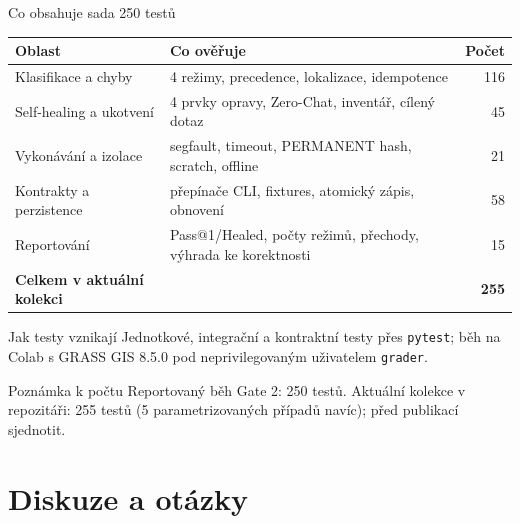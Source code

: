 \documentclass[aspectratio=169,11pt]{beamer}
\begin{document}
\begin{frame}[t]{Co obsahuje sada 250 testů}
  \footnotesize
  \begin{table}
    \centering
    \begin{tabular}{@{}p{4.2cm}p{7.0cm}r@{}}
      \toprule
      \textbf{Oblast} & \textbf{Co ověřuje} & \textbf{Počet} \\
      \midrule
      Klasifikace a chyby
        & 4 režimy, precedence, lokalizace, idempotence & 116 \\
      Self-healing a ukotvení
        & 4 prvky opravy, Zero-Chat, inventář, cílený dotaz & 45 \\
      Vykonávání a izolace
        & segfault, timeout, PERMANENT hash, scratch, offline & 21 \\
      Kontrakty a perzistence
        & přepínače CLI, fixtures, atomický zápis, obnovení & 58 \\
      Reportování
        & Pass@1/Healed, počty režimů, přechody, výhrada ke korektnosti & 15 \\
      \midrule
      \textbf{Celkem v aktuální kolekci} & & \textbf{255} \\
      \bottomrule
    \end{tabular}
  \end{table}

  \begin{block}{Jak testy vznikají}
    Jednotkové, integrační a kontraktní testy přes \texttt{pytest}; běh na Colab
    s GRASS GIS 8.5.0 pod neprivilegovaným uživatelem \texttt{grader}.
  \end{block}

  \begin{alertblock}{Poznámka k počtu}
    Reportovaný běh Gate 2: 250 testů. Aktuální kolekce v repozitáři: 255 testů
    (5 parametrizovaných případů navíc); před publikací sjednotit.
  \end{alertblock}
\end{frame}

\section{Diskuze a otázky}
\end{document}
